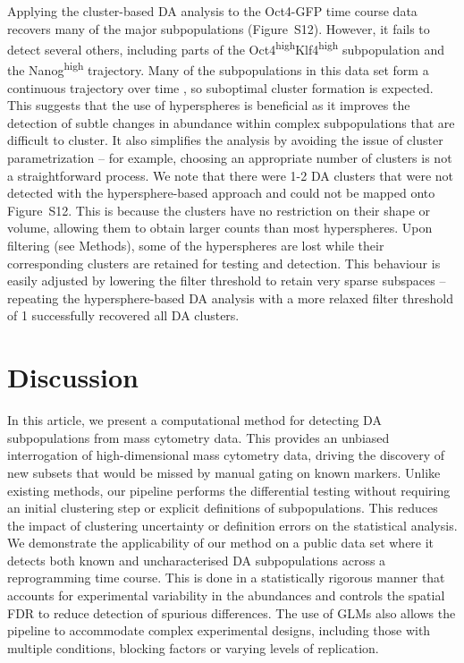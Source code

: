 \documentclass{article}
\newcommand{\suppfigclusterreal}{S12}
\begin{document}
Applying the cluster-based DA analysis to the Oct4-GFP time course data recovers many of the major subpopulations (Figure~\suppfigclusterreal{}).
However, it fails to detect several others, including parts of the Oct4\textsuperscript{high}Klf4\textsuperscript{high} subpopulation and the Nanog\textsuperscript{high} trajectory.
Many of the subpopulations in this data set form a continuous trajectory over time \cite{zunder2015continuous}, so suboptimal cluster formation is expected.
This suggests that the use of hyperspheres is beneficial as it improves the detection of subtle changes in abundance within complex subpopulations that are difficult to cluster.
It also simplifies the analysis by avoiding the issue of cluster parametrization -- for example, choosing an appropriate number of clusters is not a straightforward process.
We note that there were 1-2 DA clusters that were not detected with the hypersphere-based approach and could not be mapped onto Figure~\suppfigclusterreal{}.
This is because the clusters have no restriction on their shape or volume, allowing them to obtain larger counts than most hyperspheres.
Upon filtering (see Methods), some of the hyperspheres are lost while their corresponding clusters are retained for testing and detection.
This behaviour is easily adjusted by lowering the filter threshold to retain very sparse subspaces -- repeating the hypersphere-based DA analysis with a more relaxed filter threshold of 1 successfully recovered all DA clusters.

\section{Discussion}
In this article, we present a computational method for detecting DA subpopulations from mass cytometry data.
This provides an unbiased interrogation of high-dimensional mass cytometry data, driving the discovery of new subsets that would be missed by manual gating on known markers.
Unlike existing methods, our pipeline performs the differential testing without requiring an initial clustering step or explicit definitions of subpopulations.
This reduces the impact of clustering uncertainty or definition errors on the statistical analysis.
We demonstrate the applicability of our method on a public data set where it detects both known and uncharacterised DA subpopulations across a reprogramming time course.
This is done in a statistically rigorous manner that accounts for experimental variability in the abundances and controls the spatial FDR to reduce detection of spurious differences.
The use of GLMs also allows the pipeline to accommodate complex experimental designs, including those with multiple conditions, blocking factors or varying levels of replication.
\end{document}

